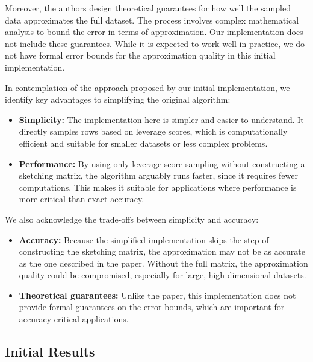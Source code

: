 \documentclass{article}
\theoremstyle{plain}
\theoremstyle{definition}
\theoremstyle{remark}
\begin{document}
Moreover, the authors design theoretical guarantees for how well the sampled data approximates the full dataset. The process involves complex mathematical analysis to bound the error in terms of approximation. Our implementation does not include these guarantees. While it is expected to work well in practice, we do not have formal error bounds for the approximation quality in this initial implementation.

In contemplation of the approach proposed by our initial implementation, we identify key advantages to simplifying the original algorithm:

\begin{itemize}

\item \textbf{Simplicity:} The implementation here is simpler and easier to understand. It directly samples rows based on leverage scores, which is computationally efficient and suitable for smaller datasets or less complex problems.

\item \textbf{Performance:} By using only leverage score sampling without constructing a sketching matrix, the algorithm arguably runs faster, since it requires fewer computations. This makes it suitable for applications where performance is more critical than exact accuracy.

\end{itemize}

We also acknowledge the trade-offs between simplicity and accuracy:

\begin{itemize}

\item \textbf{Accuracy:} Because the simplified implementation skips the step of constructing the sketching matrix, the approximation may not be as accurate as the one described in the paper. Without the full matrix, the approximation quality could be compromised, especially for large, high-dimensional datasets.

\item \textbf{Theoretical guarantees:} Unlike the paper, this implementation does not provide formal guarantees on the error bounds, which are important for accuracy-critical applications.

\end{itemize}


\subsection{Initial Results}
\end{document}
